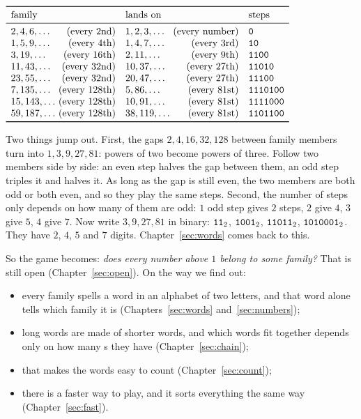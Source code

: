 \documentclass[10pt,a4paper,titlepage]{article}
\makeatletter
\newcommand{\bin}[1]{\text{\texttt{#1}}_2}
\newenvironment{herefloat}[1]
  {\par\addvspace{\intextsep}\noindent\begin{minipage}{\linewidth}%
   \def\@captype{#1}\centering}
  {\end{minipage}\par\nopagebreak\vspace{\intextsep}}
\makeatother
\begin{document}
\nopagebreak
\begin{herefloat}{table}
\centering
$\begin{array}{l@{\ }r l@{\ }r l}
\toprule
\multicolumn{2}{l}{\text{family}} & \multicolumn{2}{l}{\text{lands on}} & \text{steps} \\
\midrule
2, 4, 6, \dots & \text{(every 2nd)} & 1, 2, 3, \dots & \text{(every number)} & \bw{0} \\
1, 5, 9, \dots & \text{(every 4th)} & 1, 4, 7, \dots & \text{(every 3rd)} & \bw{10} \\
3, 19, \dots & \text{(every 16th)} & 2, 11, \dots & \text{(every 9th)} & \bw{1100} \\
11, 43, \dots & \text{(every 32nd)} & 10, 37, \dots & \text{(every 27th)} & \bw{11010} \\
23, 55, \dots & \text{(every 32nd)} & 20, 47, \dots & \text{(every 27th)} & \bw{11100} \\
7, 135, \dots & \text{(every 128th)} & 5, 86, \dots & \text{(every 81st)} & \bw{1110100} \\
15, 143, \dots & \text{(every 128th)} & 10, 91, \dots & \text{(every 81st)} & \bw{1111000} \\
59, 187, \dots & \text{(every 128th)} & 38, 119, \dots & \text{(every 81st)} & \bw{1101100} \\
\bottomrule
\end{array}$
\caption{The first families, by number of odd steps and lowest member: their members, where they land,
and their steps.}
\label{tab:families}
\end{herefloat}

Two things jump out. First, the gaps $2, 4, 16, 32, 128$ between family members turn
into $1, 3, 9, 27, 81$: powers of two become powers of three. Follow two members side
by side: an even step halves the gap between them, an odd step triples it and
halves it. As long as the gap is still even, the two members are both odd
or both even, and so they play the same steps. Second, the number of steps only
depends on how many of them are odd: $1$ odd step gives $2$ steps, $2$ give $4$,
$3$ give $5$, $4$ give $7$. Now write $3, 9, 27, 81$ in binary: $\bin{11}$, $\bin{1001}$,
$\bin{11011}$, $\bin{1010001}$. They have $2$, $4$, $5$ and $7$ digits.
Chapter~\ref{sec:words} comes back to this.

\nopagebreak
So the game becomes: \emph{does every number above $1$ belong to some family?}
That is still open (Chapter~\ref{sec:open}). On the way we find out:
\begin{itemize}
\item every family spells a word in an alphabet of two letters, and that word alone tells
  which family it is (Chapters~\ref{sec:words} and~\ref{sec:numbers});
\item long words are made of shorter words, and which words fit together depends
  only on how many s they have (Chapter~\ref{sec:chain});
\item that makes the words easy to count (Chapter~\ref{sec:count});
\item there is a faster way to play, and it sorts everything the same way
  (Chapter~\ref{sec:fast}).
\end{itemize}
\end{document}
